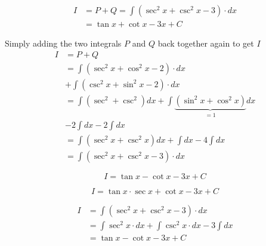 \documentclass[14pt,fleqn]{extarticle}
\begin{document}
\begin{problem}
\begin{step}
  \begin{options} 
     \correct 
     
     \begin{align}
	I &= P + Q = \int \left(\sec^2 x + \csc^2 x - 3 \right)\cdot dx \\
	&= \tan x + \cot x -3x + C 
\end{align}
       
    \end{options} 
     \reason 
     
     Simply adding the two integrals $P$ and $Q$ back together again to get $I$
     \begin{align}
	I &= P + Q \\ 
	&= \int \left(\sec^2 x + \cos^2 x - 2 \right)\cdot dx \\
	&+ \int \left(\csc^2 x + \sin^2 x - 2 \right)\cdot dx \\ 
	&= \int \left(\sec^2 + \csc^2 \right) dx + \int \underbrace{\left(\sin^2x + \cos^2 x\right)}_{=1} dx \\
	&- 2\int dx - 2\int dx \\
	&= \int \left(\sec^2 x + \csc^2 x \right)dx + \int dx - 4 \int dx \\
	&= \int \left(\sec^2 x + \csc^2 x - 3\right)\cdot dx 
\end{align}
       
\end{step}

\begin{step}
  \begin{options} 
     \correct 
       
       \[ I = \tan x - \cot x - 3x + C \]
     \incorrect
        
         \[ I = \tan x\cdot \sec x +\cot x - 3x + C \]
    \end{options} 
     \reason 
       
       \begin{align}
	I &= \int \left(\sec^2x + \csc^2 x - 3 \right)\cdot dx \\ 
	&= \int \sec^2 x\cdot dx + \int \csc^2 x \cdot dx - 3 \int dx \\
	&= \tan x - \cot x - 3x + C 
\end{align}
\end{step}
\end{problem} 
\end{document}
